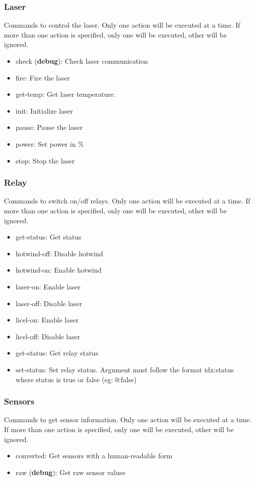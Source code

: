 \documentclass[letterpaper, 10 pt]{article}
\begin{document}
\subsubsection{Laser}
Commands to control the laser. Only one action will be executed at a time. If more than one action is specified, only one will be executed, other will be ignored.
\begin{itemize}
	\item check (\textbf{debug}): Check laser communication
	\item fire: Fire the laser
	\item get-temp: Get laser temperature. 
	\item init: Initialize laser
	\item pause: Pause the laser
	\item power: Set power in \%
	\item stop: Stop the laser
\end{itemize}

\subsubsection{Relay}
Commands to switch on/off relays. Only one action will be executed at a time. If more than one action is specified, only one will be executed, other will be ignored.
\begin{itemize}
	\item get-status: Get status
	\item hotwind-off: Disable hotwind
	\item hotwind-on: Enable hotwind
	\item laser-on: Enable laser
	\item laser-off: Disable laser
	\item licel-on: Enable laser
	\item licel-off: Disable laser
	\item get-status: Get relay status
	\item set-status: Set relay status. Argument must follow the format idx:status where status is true or false (eg: 0:false)
\end{itemize}

\subsubsection{Sensors}
Commands to get sensor information. Only one action will be executed at a time. If more than one action is specified, only one will be executed, other will be ignored.
\begin{itemize}
	\item converted: Get sensors with a human-readable form
	\item raw (\textbf{debug}): Get raw sensor values
\end{itemize}
\end{document}
